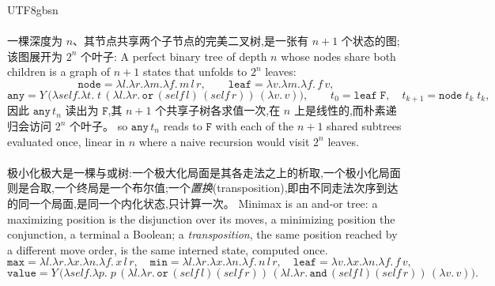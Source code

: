 \begin{CJK*}{UTF8}{gbsn}
  \paragraph{}
  \ifTablambdaChinese 一棵深度为 $n$、其节点共享两个子节点的完美二叉树,是一张有 $n+1$ 个状态的图;该图展开为 $2^{n}$ 个叶子: \else A perfect binary tree of depth $n$ whose nodes share both children is a graph of $n+1$ states that unfolds to $2^{n}$ leaves: \fi
  \[
    \mathtt{node} = \lambda l.\lambda r.\lambda m.\lambda f.\,m\,l\,r, \qquad
    \mathtt{leaf} = \lambda v.\lambda m.\lambda f.\,f\,v,
  \]
  \[
    \mathtt{any} = Y\,\big(\lambda\mathit{self}.\lambda t.\;
    t\,(\lambda l.\lambda r.\,\mathtt{or}\,(\mathit{self}\,l)\,(\mathit{self}\,r))\,(\lambda v.\,v)\big),
    \qquad t_0 = \mathtt{leaf}\;\mathtt{F},\quad t_{k+1} = \mathtt{node}\;t_k\;t_k,
  \]
  \ifTablambdaChinese 因此 $\mathtt{any}\,t_n$ 读出为 $\mathtt{F}$,其 $n+1$ 个共享子树各求值一次,在 $n$ 上是线性的,而朴素递归会访问 $2^{n}$ 个叶子。 \else so $\mathtt{any}\,t_n$ reads to $\mathtt{F}$ with each of the $n+1$ shared subtrees evaluated once, linear in $n$ where a naive recursion would visit $2^{n}$ leaves. \fi

  \paragraph{}
  \ifTablambdaChinese
  极小化极大是一棵与或树:一个极大化局面是其各走法之上的析取,一个极小化局面则是合取,一个终局是一个布尔值;一个\emph{置换}(transposition),即由不同走法次序到达的同一个局面,是同一个内化状态,只计算一次。
  \else
  Minimax is an and-or tree: a maximizing position is the disjunction over its moves, a minimizing position the conjunction, a terminal a Boolean; a \emph{transposition}, the same position reached by a different move order, is the same interned state, computed once.
  \fi
  \[
    \mathtt{max} = \lambda l.\lambda r.\lambda x.\lambda n.\lambda f.\,x\,l\,r, \quad
    \mathtt{min} = \lambda l.\lambda r.\lambda x.\lambda n.\lambda f.\,n\,l\,r, \quad
    \mathtt{leaf} = \lambda v.\lambda x.\lambda n.\lambda f.\,f\,v,
  \]
  \[
    \mathtt{value} = Y\,\big(\lambda\mathit{self}.\lambda p.\;
      p\,(\lambda l.\lambda r.\,\mathtt{or}\,(\mathit{self}\,l)(\mathit{self}\,r))\,
    (\lambda l.\lambda r.\,\mathtt{and}\,(\mathit{self}\,l)(\mathit{self}\,r))\,(\lambda v.\,v)\big).
  \]


\end{CJK*}

